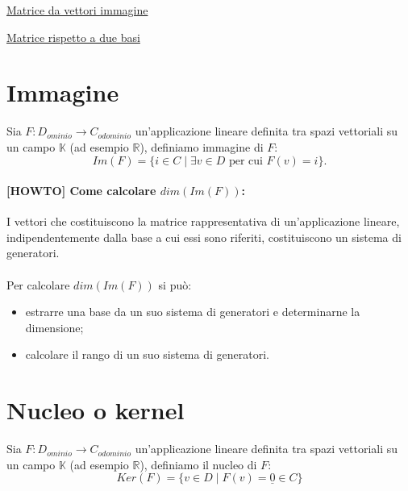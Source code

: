 \documentclass[a4paper]{article}
\begin{document}
        \href{http://www.youmath.it/forum/algebra-lineare/66337-matrice-di-un-endomorfismo-con-il-vettore-immagine.html}{Matrice da vettori immagine}

        \href{http://www.youmath.it/forum/algebra-lineare/66469-matrice-associata-ad-un-endomorfismo-rispetto-a-due-basi-diverse.html}{Matrice rispetto a due basi}


        \section*{Immagine}
        Sia $F\!: D_{ominio} \to C_{odominio}$ un'applicazione lineare definita tra spazi vettoriali su un campo $\mathbb{K}$ (ad esempio $\mathbb{R}$), definiamo immagine di $F$:
        \[
                Im(F) = \{i \in C \;|\; \exists v \in D \mbox{ per cui } F(v) = i\}.
        \]

        \paragraph{[HOWTO] Come calcolare $dim(Im(F))$:}
        I vettori che costituiscono la matrice rappresentativa di un'applicazione lineare,
        indipendentemente dalla base a cui essi sono riferiti, costituiscono un sistema di generatori.

        \paragraph{}
        Per calcolare $dim(Im(F))$ si pu\`{o}:
        \begin{itemize}
                \item estrarre una base da un suo sistema di generatori e determinarne la dimensione;
                \item calcolare il rango di un suo sistema di generatori.
        \end{itemize}


        \section*{Nucleo o kernel}
        Sia $F\!: D_{ominio} \to C_{odominio}$ un'applicazione lineare definita tra spazi vettoriali su un campo $\mathbb{K}$ (ad esempio $\mathbb{R}$), definiamo il nucleo di $F$:
        \[
                Ker(F) = \{v \in D \;|\; F(v) = \underline{0} \in C\}
        \]
\end{document}

